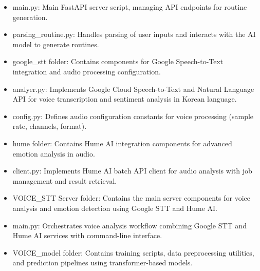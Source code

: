 \documentclass[conference]{IEEEtran}
\begin{document}
\begin{enumerate}[label=\arabic*]
\begin{itemize}[label=-]
        \item main.py: Main FastAPI server script, managing API endpoints for routine generation.
        \vspace{0.7em}

        \item parsing\_routine.py: Handles parsing of user inputs and interacts with the AI model to generate routines.
        \vspace{0.7em}

        \item google\_stt folder: Contains components for Google Speech-to-Text integration and audio processing configuration.
        \vspace{0.7em}

        \item analyer.py: Implements Google Cloud Speech-to-Text and Natural Language API for voice transcription and sentiment analysis in Korean language.
        \vspace{0.7em}

        \item config.py: Defines audio configuration constants for voice processing (sample rate, channels, format).
        \vspace{0.7em}

        \item hume folder: Contains Hume AI integration components for advanced emotion analysis in audio.
        \vspace{0.7em}

        \item client.py: Implements Hume AI batch API client for audio analysis with job management and result retrieval.
        \vspace{0.7em}

        \item VOICE\_STT Server folder: Contains the main server components for voice analysis and emotion detection using Google STT and Hume AI.
        \vspace{0.7em}

        \item main.py: Orchestrates voice analysis workflow combining Google STT and Hume AI services with command-line interface.
        \vspace{0.7em}

        \item VOICE\_model folder: Contains training scripts, data preprocessing utilities, and prediction pipelines using transformer-based models.
        \vspace{0.7em}


\end{itemize}
\end{enumerate}
\end{document}
